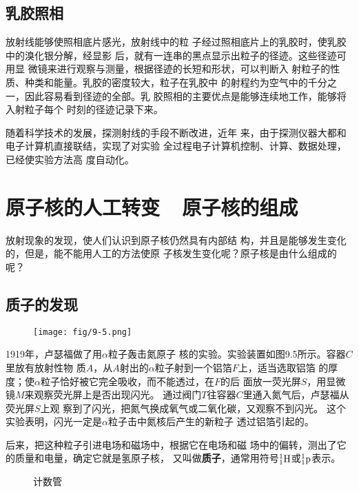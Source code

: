 \subsection{乳胶照相}

放射线能够使照相底片感光，放射线中的粒
子经过照相底片上的乳胶时，使乳胶中的溴化银分解，经显影
后，就有一连串的黑点显示出粒子的径迹。这些径迹可用显
微镜来进行观察与测量，根据径迹的长短和形状，可以判断入
射粒子的性质、种类和能量。乳胶的密度较大，粒子在乳胶中
的射程约为空气中的千分之一，因此容易看到径迹的全部。乳
胶照相的主要优点是能够连续地工作，能够将入射粒子每个
时刻的径迹记录下来。

随着科学技术的发展，探测射线的手段不断改进，近年
来，由于探测仪器大都和电子计算机直接联结，实现了对实验
全过程电子计算机控制、计算、数据处理，已经使实验方法高
度自动化。

\section{原子核的人工转变~~原子核的组成}
放射现象的发现，使人们认识到原子核仍然具有内部结
构，并且是能够发生变化的，但是，能不能用人工的方法使原
子核发生变化呢？原子核是由什么组成的呢？

\subsection{质子的发现}
\begin{figure}[htp]\centering
\texttt{[image: fig/9-5.png]}
\caption{}
\end{figure}

1919年，卢瑟福做了用$\alpha$粒子轰击氮原子
核的实验。实验装置如图9.5所示。容器$C$里放有放射性物
质$A$，从$A$射出的$\alpha$粒子射到一个铝箔$F$上，适当选取铝箔
的厚度；使$\alpha$粒子恰好被它完全吸收，而不能透过，在$F$的后
面放一荧光屏$S$，用显微镜$M$来观察荧光屏上是否出现闪光。
通过阀门$T$往容器$C$里通入氮气后，卢瑟福从荧光屏$S$上观
察到了闪光，把氮气换成氧气或二氧化碳，又观察不到闪光。
这个实验表明，闪光一定是$\alpha$粒子击中氮核后产生的新粒子
透过铝箔引起的。

后来，把这种粒子引进电场和磁场中，根据它在电场和磁
场中的偏转，测出了它的质量和电量，确定它就是氢原子核，
又叫做\textbf{质子}，通常用符号$\atom{H}{1}{1}$或$\atom{p}{1}{1}$表示。
\begin{figure}[htp]\centering
{}\qquad\qquad {}
\caption{计数管}
\end{figure}

